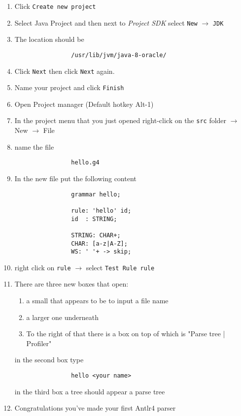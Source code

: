 \documentclass{article}
\begin{document}
		\begin{enumerate}
			\item Click \texttt{Create new project}

			\item Select Java Project and then next to \textit{Project SDK} select \texttt{New} $\rightarrow$ \texttt{JDK}

			\item The location should be
			\begin{lstlisting}
				/usr/lib/jvm/java-8-oracle/
			\end{lstlisting}

			\item Click \texttt{Next} then click \texttt{Next} again.

			\item Name your project and click \texttt{Finish}

			\item Open Project manager (Default hotkey Alt-1)

			\item In the project menu that you just opened right-click on the \texttt{src} folder $\rightarrow$ New $\rightarrow$ File

			\item name the file
			\begin{lstlisting}
				hello.g4
			\end{lstlisting}

			\item In the new file put the following content
			\begin{lstlisting}
				grammar hello;

				rule: 'hello' id;
				id  : STRING;

				STRING: CHAR+;
				CHAR: [a-z|A-Z];
				WS: ' '+ -> skip;
			\end{lstlisting}

			\item right click on \texttt{rule} $\rightarrow$ select \texttt{Test Rule rule}

			\item There are three new boxes that open:
			\begin{enumerate}
				\item a small that appears to be to input a file name
				\item a larger one underneath
				\item To the right of that there is a box on top of which is "Parse tree | Profiler"
			\end{enumerate}
			in the second box type
			\begin{lstlisting}
				hello <your name>
			\end{lstlisting}
			in the third box a tree should appear a parse tree

			\item Congratulations you've made your first Antlr4 parser

		\end{enumerate}
\end{document}
